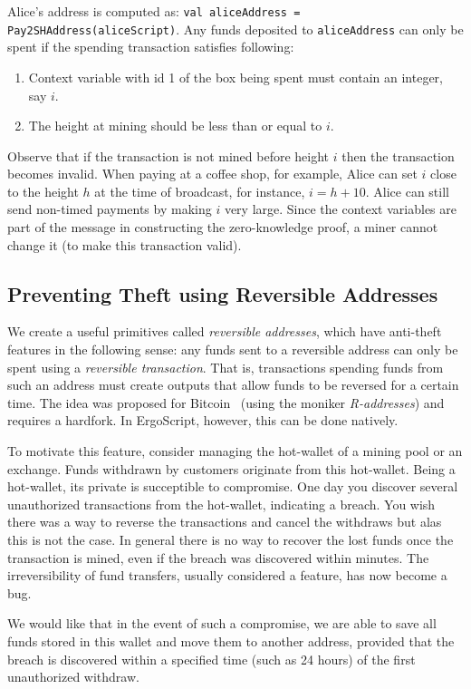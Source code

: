 \documentclass[11pt]{article}
\newcommand{\langname}{ErgoScript\xspace}
\begin{document}
Alice's address is computed as: \texttt{val aliceAddress = Pay2SHAddress(aliceScript)}. Any funds deposited to \texttt{aliceAddress} can only be spent if the spending transaction satisfies following:
\begin{enumerate}
	\item Context variable with id 1 of the box being spent must contain an integer, say $i$.
	\item The height at mining should be less than or equal to $i$. 
\end{enumerate}

Observe that if the transaction is not mined before height $i$ then the transaction becomes invalid. When paying at a coffee shop, for example, Alice can set $i$ close to the height $h$ at the time of broadcast, for instance, $i = h + 10$. 
Alice can still send non-timed payments by making $i$ very large. Since the context variables are part of the message in constructing the zero-knowledge proof, a miner cannot change it (to make this transaction valid). 

\subsection{Preventing Theft using Reversible Addresses}

We create a useful primitives called {\em reversible addresses}, which have anti-theft features in the following sense:
any funds sent to a reversible address can only be spent using a {\em reversible transaction}. That is, transactions spending funds from such an address must create outputs that allow funds to be reversed for a certain time. The idea was proposed for Bitcoin~\cite{raddress} (using the moniker {\em R-addresses}) and requires a hardfork. In \langname, however, this can be done natively.

To motivate this feature, consider managing the hot-wallet of a mining pool or an exchange. Funds withdrawn by customers originate from this hot-wallet. Being a hot-wallet, its private is succeptible to compromise. One day you discover several unauthorized transactions from the hot-wallet, indicating a breach. You wish there was a way to reverse the transactions and cancel the withdraws but alas this is not the case. In general there is no way to recover the lost funds once the transaction is mined, even if the breach was discovered within minutes. The irreversibility of fund transfers, usually considered a feature, has now become a bug.

We would like that in the event of such a compromise, we are able to save all funds stored in this wallet and move them to another address, provided that the breach is discovered within a specified time (such as 24 hours) of the first unauthorized withdraw. 
\end{document}
